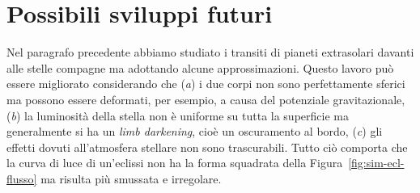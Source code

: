 \section{Possibili sviluppi futuri}
\label{sec:sviluppi-futuri}

Nel paragrafo precedente abbiamo studiato i transiti di pianeti extrasolari
davanti alle stelle compagne ma adottando alcune approssimazioni. Questo lavoro
può essere migliorato considerando che (\emph{a}) i due corpi non sono
perfettamente sferici ma possono essere deformati, per esempio, a causa del
potenziale gravitazionale, (\emph{b}) la luminosità della stella non è uniforme
su tutta la superficie ma generalmente si ha un \emph{limb darkening}, cioè un
oscuramento al bordo, (\emph{c}) gli effetti dovuti all'atmosfera stellare non
sono trascurabili. Tutto ciò comporta che la curva di luce di un'eclissi non ha
la forma squadrata della Figura~\ref{fig:sim-ecl-flusso} ma risulta più smussata
e irregolare.

